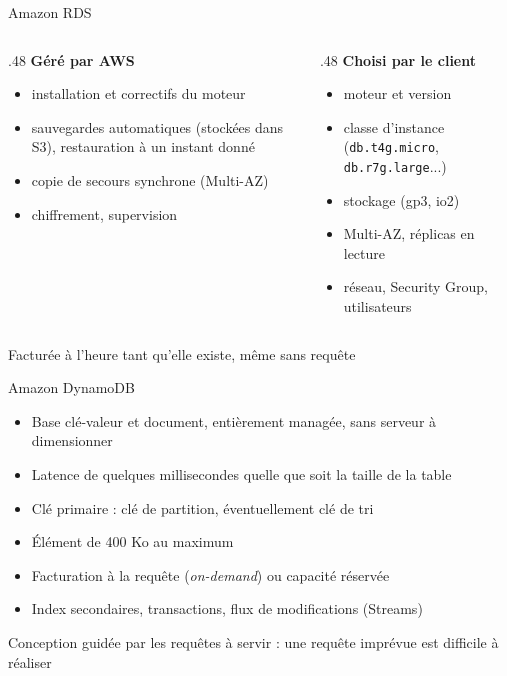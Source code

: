 \begin{frame}{Amazon RDS}
  \begin{columns}[T]
    \begin{column}{.48\textwidth}
      \textbf{Géré par AWS}
      \begin{itemize}
        \setlength{\itemsep}{.35em}
        \item installation et correctifs du moteur
        \item sauvegardes automatiques (stockées dans S3), restauration à un instant donné
        \item copie de secours synchrone (Multi-AZ)
        \item chiffrement, supervision
      \end{itemize}
    \end{column}
    \begin{column}{.48\textwidth}
      \textbf{Choisi par le client}
      \begin{itemize}
        \setlength{\itemsep}{.35em}
        \item moteur et version
        \item classe d'instance (\texttt{db.t4g.micro}, \texttt{db.r7g.large}...)
        \item stockage (gp3, io2)
        \item Multi-AZ, réplicas en lecture
        \item réseau, Security Group, utilisateurs
      \end{itemize}
    \end{column}
  \end{columns}
  \bigskip
  \attention Facturée à l'heure tant qu'elle existe, même sans requête
\end{frame}

\begin{frame}{Amazon DynamoDB}
  \begin{itemize}
    \setlength{\itemsep}{.45em}
    \item Base clé-valeur et document, entièrement managée, sans serveur à dimensionner
    \item Latence de quelques millisecondes quelle que soit la taille de la table
    \item Clé primaire : clé de partition, éventuellement clé de tri
    \item Élément de 400 Ko au maximum
    \item Facturation à la requête (\emph{on-demand}) ou capacité réservée
    \item Index secondaires, transactions, flux de modifications (Streams)
  \end{itemize}
  \bigskip
  \attention Conception guidée par les requêtes à servir : une requête imprévue est difficile à réaliser
\end{frame}

